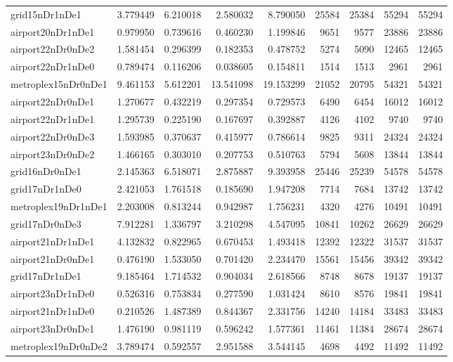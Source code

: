 \begin{longtable}{|l|r|r|r|r|r|r|r|r|}
grid15nDr1nDe1 & 3.779449 & 6.210018 & 2.580032 & 8.790050 & 25584 & 25384 & 55294 & 55294 \\
airport20nDr1nDe1 & 0.979950 & 0.739616 & 0.460230 & 1.199846 & 9651 & 9577 & 23886 & 23886 \\
airport22nDr0nDe2 & 1.581454 & 0.296399 & 0.182353 & 0.478752 & 5274 & 5090 & 12465 & 12465 \\
airport22nDr1nDe0 & 0.789474 & 0.116206 & 0.038605 & 0.154811 & 1514 & 1513 & 2961 & 2961 \\
metroplex15nDr0nDe1 & 9.461153 & 5.612201 & 13.541098 & 19.153299 & 21052 & 20795 & 54321 & 54321 \\
airport22nDr0nDe1 & 1.270677 & 0.432219 & 0.297354 & 0.729573 & 6490 & 6454 & 16012 & 16012 \\
airport22nDr1nDe1 & 1.295739 & 0.225190 & 0.167697 & 0.392887 & 4126 & 4102 & 9740 & 9740 \\
airport22nDr0nDe3 & 1.593985 & 0.370637 & 0.415977 & 0.786614 & 9825 & 9311 & 24324 & 24324 \\
airport23nDr0nDe2 & 1.466165 & 0.303010 & 0.207753 & 0.510763 & 5794 & 5608 & 13844 & 13844 \\
grid16nDr0nDe1 & 2.145363 & 6.518071 & 2.875887 & 9.393958 & 25446 & 25239 & 54578 & 54578 \\
grid17nDr1nDe0 & 2.421053 & 1.761518 & 0.185690 & 1.947208 & 7714 & 7684 & 13742 & 13742 \\
metroplex19nDr1nDe1 & 2.203008 & 0.813244 & 0.942987 & 1.756231 & 4320 & 4276 & 10491 & 10491 \\
grid17nDr0nDe3 & 7.912281 & 1.336797 & 3.210298 & 4.547095 & 10841 & 10262 & 26629 & 26629 \\
airport21nDr1nDe1 & 4.132832 & 0.822965 & 0.670453 & 1.493418 & 12392 & 12322 & 31537 & 31537 \\
airport21nDr0nDe1 & 0.476190 & 1.533050 & 0.701420 & 2.234470 & 15561 & 15456 & 39342 & 39342 \\
grid17nDr1nDe1 & 9.185464 & 1.714532 & 0.904034 & 2.618566 & 8748 & 8678 & 19137 & 19137 \\
airport23nDr1nDe0 & 0.526316 & 0.753834 & 0.277590 & 1.031424 & 8610 & 8576 & 19841 & 19841 \\
airport21nDr1nDe0 & 0.210526 & 1.487389 & 0.844367 & 2.331756 & 14240 & 14184 & 33483 & 33483 \\
airport23nDr0nDe1 & 1.476190 & 0.981119 & 0.596242 & 1.577361 & 11461 & 11384 & 28674 & 28674 \\
metroplex19nDr0nDe2 & 3.789474 & 0.592557 & 2.951588 & 3.544145 & 4698 & 4492 & 11492 & 11492 \\

\end{longtable}
